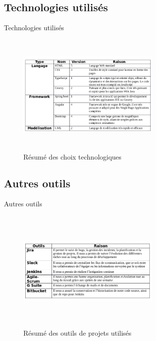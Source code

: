 \documentclass[xcolor=dvipsnames]{beamer}
\begin{document}
  \subsection{Technologies utilisés}
  \begin{frame}{Technologies utilisés}
  \begin{center}
    \begin{figure}[H]
      \includegraphics[scale=0.1, width=7cm, height=6cm]{images/resumeChoix.png}
      \caption{Résumé des choix technologiques}
    \end{figure} 
  \end{center}	
  \end{frame}

  \subsection{Autres outils}
  \begin{frame}{Autres outils}
  \begin{center}
    \begin{figure}[H]
      \includegraphics[scale=0.1, width=7cm, height=6cm]{images/resumeOutils.png}
      \caption{Résumé des outils de projets utilisés}
    \end{figure} 
  \end{center}	
  \end{frame}
    
\end{document}
